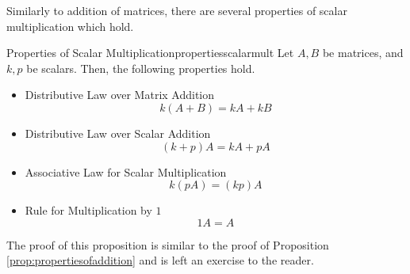Similarly to addition of matrices, there are several properties of scalar multiplication which hold.

\begin{proposition}{Properties of Scalar Multiplication}{propertiesscalarmult}
Let $A, B$ be matrices, and $k, p$ be scalars. Then, the following properties hold.
\begin{itemize}
\item Distributive Law over Matrix Addition
\begin{equation*}
k \left( A+B\right) =k A+ kB  
\end{equation*}

\item Distributive Law over Scalar Addition
\begin{equation*}
\left( k +p \right) A= k A+p A
\end{equation*}

\item Associative Law for Scalar Multiplication
\begin{equation*}
k \left( p A\right) = \left( k p \right) A 
\end{equation*}

\item Rule for Multiplication by $1$
\begin{equation*}
1A=A  
\end{equation*}
\end{itemize}

\end{proposition}

The proof of this proposition is similar to the proof of Proposition \ref{prop:propertiesofaddition} and is left an exercise to the reader.
